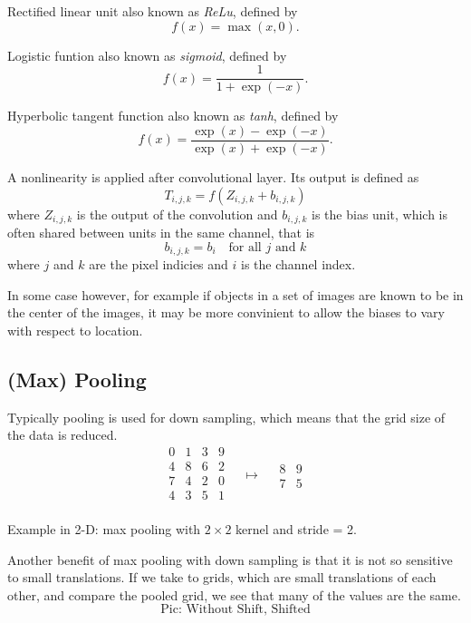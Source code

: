 \documentclass[]{article}
\begin{document}
Rectified linear unit also known as \emph{ReLu}, defined by
\[
f(x) = \max(x, 0).
\]

Logistic funtion also known as \emph{sigmoid}, defined by
\[
f(x) = \frac{1}{1 + \exp(-x)}.
\]

Hyperbolic tangent function also known as \emph{tanh}, defined by
\[
f(x) = \frac{\exp(x) - \exp(-x)}{\exp(x) + \exp(-x)}.
\]

A nonlinearity is applied after convolutional layer. Its output is defined as
\[
T_{i,j,k} = f(Z_{i, j, k} + b_{i,j,k})
\]
where $Z_{i, j, k}$ is the output of the convolution and $b_{i, j, k}$ is the bias
unit, which is often shared between units in the same channel, that is
\[
b_{i, j, k} = b_i \quad \text{for all $j$ and $k$}
\]
where $j$ and $k$ are the pixel indicies and $i$ is the channel index.

In some case however, for example if objects in a set of images are known to be
in the center of the images, it may be more convinient to allow the biases to vary
with respect to location.

\subsection{(Max) Pooling}
Typically pooling is used for down sampling, which means that the grid size of
the data is reduced.
\[
\begin{array}{c|c|c|c}
  0 & 1 & 3 & 9\\
  \hline
  4 & 8 & 6 & 2\\
  \hline
  7 & 4 & 2 & 0\\
  \hline
  4 & 3 & 5 & 1\\
 \end{array}
 \quad \mapsto \quad
 \begin{array}{c|c}
   8 & 9\\
   \hline
   7 & 5
  \end{array}
 \]
\begin{center}Example in 2-D: max pooling with $2\times2$ kernel and stride = 2.\end{center}
Another benefit of max pooling with down sampling is that it is not so sensitive
to small translations. If we take to grids, which are small translations of each
other, and compare the pooled grid, we see that many of the values are the same.
\[
\text{Pic: Without Shift, Shifted}
\]
\end{document}
